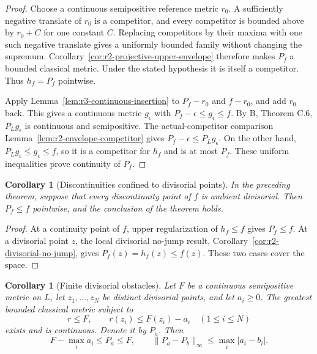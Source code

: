 \documentclass[11pt,a4paper]{article}
\numberwithin{equation}{section}
\newtheorem{corollary}[theorem]{Corollary}
\theoremstyle{definition}
\theoremstyle{remark}
\begin{document}
\begin{proof}
Choose a continuous semipositive reference metric $r_0$.
A sufficiently negative translate of $r_0$ is a competitor, and
every competitor is bounded above by $r_0+C$ for one constant $C$.
Replacing competitors by their maxima with one such negative
translate gives a uniformly bounded family without changing the
supremum. Corollary~\ref{cor:r2-projective-upper-envelope} therefore
makes $P_f$ a bounded classical metric. Under the stated hypothesis
it is itself a competitor. Thus $h_f=P_f$ pointwise.

Apply Lemma~\ref{lem:r3-continuous-insertion} to $P_f-r_0$ and
$f-r_0$, and add $r_0$ back. This gives a continuous metric
$g_\epsilon$ with $P_f-\epsilon\leq g_\epsilon\leq f$.
By B, Theorem C.6, $P_Lg_\epsilon$ is continuous and semipositive.
The actual-competitor comparison
Lemma~\ref{lem:r2-envelope-competitor} gives
$P_f-\epsilon\leq P_Lg_\epsilon$.
On the other hand, $P_Lg_\epsilon\leq g_\epsilon\leq f$, so it is
a competitor for $h_f$ and is at most $P_f$. These uniform
inequalities prove continuity of $P_f$.
\end{proof}

\begin{corollary}[Discontinuities confined to divisorial points]
\label{cor:r3-divisorial-lsc-obstacle}
In the preceding theorem, suppose that every discontinuity point
of $f$ is ambient divisorial. Then $P_f\leq f$ pointwise, and the
conclusion of the theorem holds.
\end{corollary}

\begin{proof}
At a continuity point of $f$, upper regularization of $h_f\leq f$
gives $P_f\leq f$. At a divisorial point $z$, the local
divisorial no-jump result, Corollary~\ref{cor:r2-divisorial-no-jump},
gives $P_f(z)=h_f(z)\leq f(z)$. These two cases cover the space.
\end{proof}

\begin{corollary}[Finite divisorial obstacles]
\label{cor:r3-finite-divisorial-obstacle}
Let $F$ be a continuous semipositive metric on $L$, let
$z_1,\ldots,z_N$ be distinct divisorial points, and let $a_i\geq0$.
The greatest bounded classical metric subject to
\[
 r\leq F,\qquad r(z_i)\leq F(z_i)-a_i\quad(1\leq i\leq N)
\]
exists and is continuous. Denote it by $P_a$. Then
\[
 F-\max_i a_i\leq P_a\leq F,
 \qquad
 \|P_a-P_b\|_\infty\leq\max_i|a_i-b_i|.
\]
\end{corollary}
\end{document}
